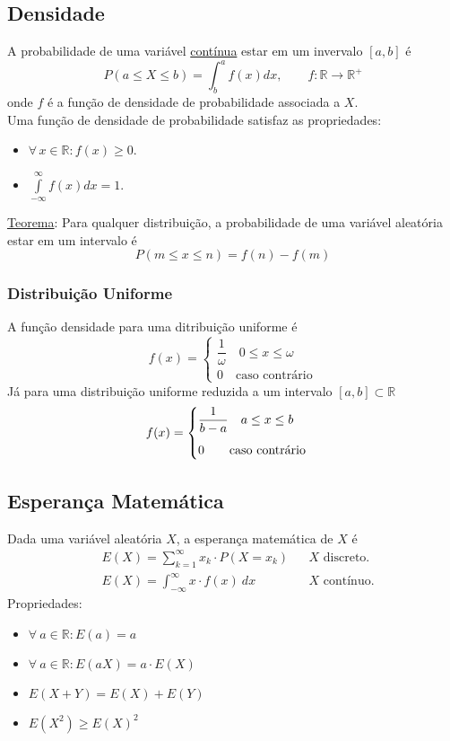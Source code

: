 \documentclass{article}
\begin{document}
\subsection{Densidade}
A probabilidade de uma variável \uline{contínua} estar em um invervalo $[a,b]$ é
\[ P(a \leq X \leq b) = \int_b^a f(x) dx, \qquad f: \mathbb{R} \to \mathbb{R}^+ \]
onde $f$ é a função de densidade de probabilidade associada a $X$. \\[10pt]
Uma função de densidade de probabilidade satisfaz as propriedades:
\begin{itemize}
  \item $\forall\, x \in \mathbb{R}: f(x) \geq 0$.
  \item $\int\limits_{-\infty}^{\infty} f(x) dx = 1$.
\end{itemize}
\uline{Teorema}: Para qualquer distribuição, a probabilidade de uma variável aleatória estar em um intervalo é
\[ P(m \leq x \leq n) = f(n) - f(m) \]

\subsubsection{Distribuição Uniforme}
A função densidade para uma ditribuição uniforme é
\[
  f(x) = \begin{cases}
          \dfrac{1}{\omega} \quad 0 \leq x \leq \omega \\[10pt]
          0 \quad \text{caso contrário}
         \end{cases}
\]
Já para uma distribuição uniforme reduzida a um intervalo $[a,b] \subset \mathbb{R}$
\[
  f(x) = \begin{cases}
          \dfrac{1}{b - a} \quad a \leq x \leq b \\[10pt]
          0 \qquad \text{caso contrário}
         \end{cases} \\[10pt]
\]

\pagebreak

\subsection{Esperança Matemática}
Dada uma variável aleatória $X$, a esperança matemática de $X$ é
\begin{align*}
  & E(X) = \sum_{k=1}^{\infty} x_k \cdot P(X = x_k) && \text{$X$ discreto.} \\[5pt]
  & E(X) = \int_{-\infty}^{\infty} x \cdot f(x) \: dx && \text{$X$ contínuo.}
\end{align*}
Propriedades:
\begin{itemize}
  \item $\forall\: a \in \mathbb{R}: E(a) = a$
  \item $\forall\: a \in \mathbb{R}: E(aX) = a \cdot E(X)$
  \item $E(X + Y) = E(X) + E(Y)$
  \item $E(X^2) \geq {E(X)}^2$
\end{itemize}
\end{document}
